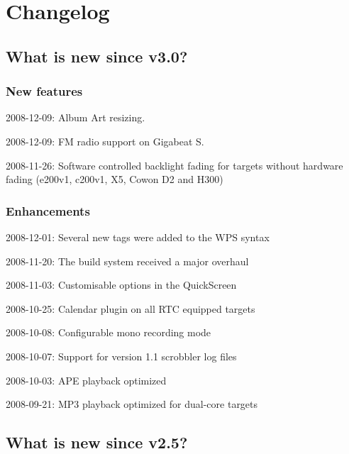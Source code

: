 \chapter{\label{ref:changelog}Changelog}
\section{What is new since v3.0?}

\subsection{New features}
\begin{changelog}
\item 2008-12-09: Album Art resizing.
\item 2008-12-09: FM radio support on Gigabeat S.
\item 2008-11-26: Software controlled backlight fading for targets without hardware fading (e200v1, c200v1, X5, Cowon D2 and H300)
\end{changelog}

\subsection{Enhancements}
\begin{changelog}
\item 2008-12-01: Several new tags were added to the WPS syntax
\item 2008-11-20: The build system received a major overhaul
\item 2008-11-03: Customisable options in the QuickScreen
\item 2008-10-25: Calendar plugin on all RTC equipped targets
\item 2008-10-08: Configurable mono recording mode
\item 2008-10-07: Support for version 1.1 scrobbler log files
\item 2008-10-03: APE playback optimized
\item 2008-09-21: MP3 playback optimized for dual-core targets
\end{changelog}

\section{What is new since v2.5?}

